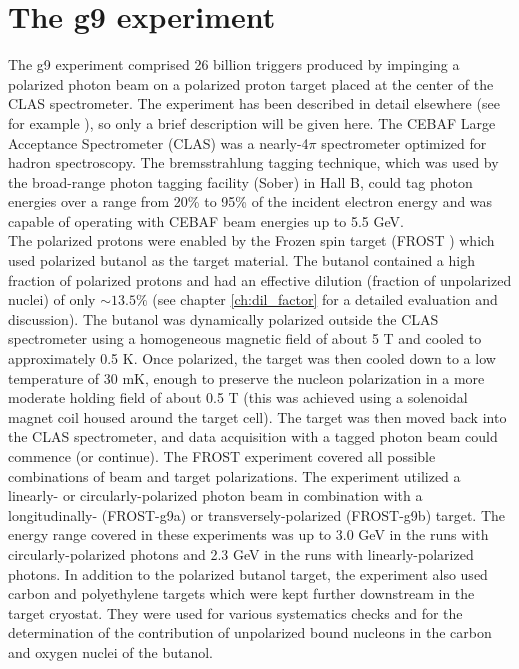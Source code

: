 \section{The g9 experiment}
The g9 experiment comprised 26 billion triggers produced by impinging  a  polarized photon beam on a polarized proton target placed at the center of the CLAS spectrometer. The experiment has been described in detail elsewhere (see for example \cite{Strauch_2014}), so only a brief description will be given here. 
 The CEBAF Large Acceptance Spectrometer (CLAS)\cite{CLAS} was a nearly-4$\pi$ spectrometer optimized for hadron spectroscopy. The bremsstrahlung tagging technique, which was used by the broad-range photon tagging facility (Sober\cite{Sober_2000}) in Hall B, could tag photon energies over a range from 20\% to 95\% of the incident electron energy and was capable of operating with CEBAF beam energies up to 5.5 GeV. \\
The polarized protons were enabled by the Frozen spin target (FROST \cite{Keith_2012}) which used polarized butanol as the target material.
The butanol contained a high fraction of polarized protons and had an effective dilution (fraction of unpolarized nuclei) of only $\sim 13.5\%$ (see chapter \ref{ch:dil_factor} for a detailed evaluation and discussion).
 The butanol was dynamically polarized outside the CLAS spectrometer using a homogeneous magnetic field of about 5 T and cooled to approximately 0.5 K. Once polarized, the target was then cooled down to a low temperature of 30 mK, enough to preserve the nucleon polarization in a more moderate holding field of about 0.5 T (this was achieved using a solenoidal magnet coil housed around the target cell). The target was then moved back into the CLAS spectrometer, and data acquisition with a tagged photon beam could commence (or continue). The FROST experiment covered all possible combinations of beam and target polarizations. The experiment utilized a linearly- or circularly-polarized photon beam in combination with a longitudinally- (FROST-g9a) or transversely-polarized (FROST-g9b) target. The energy range covered in these experiments was up to 3.0 GeV in the runs with circularly-polarized photons and 2.3 GeV in the runs with linearly-polarized photons. In addition to the polarized butanol target, the experiment also used carbon and polyethylene targets which were kept further downstream in the target cryostat. They were used for various systematics checks and for the determination of the contribution of unpolarized bound nucleons in the carbon and oxygen nuclei of the butanol.
